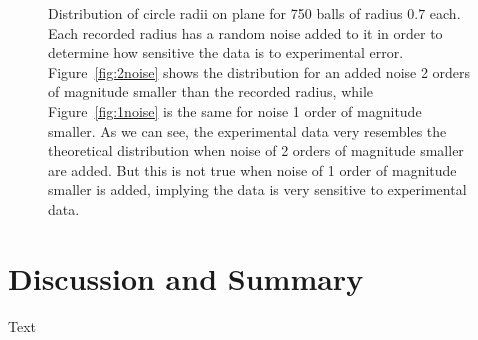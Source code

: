 \documentclass[journal]{IEEEtran}
\begin{document}
\begin{figure}[ht!]
  \centering
  \centering
  \caption{Distribution of circle radii on plane for 750 balls of radius $0.7$
    each. Each recorded radius has a random noise added to it in order to
    determine how sensitive the data is to experimental
    error. Figure~\ref{fig:2noise} shows the distribution for an added noise 2
    orders of magnitude smaller than the recorded radius, while
    Figure~\ref{fig:1noise} is the same for noise 1 order of magnitude smaller. As
    we can see, the experimental data very resembles the theoretical
    distribution when noise of 2 orders of magnitude smaller are added. But this
    is not true when noise of 1 order of magnitude smaller is added, implying
    the data is very sensitive to experimental data.}
  \label{fig:noiseplots}
\end{figure}

\section{Discussion and Summary}
Text



\end{document}
